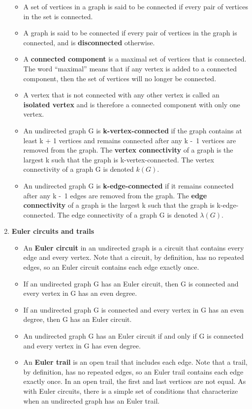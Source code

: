 \documentclass[12pt,a4paper]{article}
\begin{document}
\begin{enumerate}
  \begin{itemize}
    \item A set of vertices in a graph is said to be connected if every pair of vertices in the set is connected.
    \item A graph is said to be connected if every pair of vertices in the graph is connected, and is \textbf{disconnected} otherwise.
    \item A \textbf{connected component} is a maximal set of vertices that is connected. The word ``maximal'' means that if any vertex is added to a connected component, then the set of vertices will no longer be connected.
    \item A vertex that is not connected with any other vertex is called an \textbf{isolated vertex} and is therefore a connected component with only one vertex.
    \item An undirected graph G is \textbf{k-vertex-connected} if the graph contains at least k + 1 vertices and remains connected after any k -\ 1 vertices are removed from the graph. The \textbf{vertex connectivity} of a graph is the largest k such that the graph is k-vertex-connected. The vertex connectivity of a graph G is denoted \(k(G)\).
    \item An undirected graph G is \textbf{k-edge-connected} if it remains connected after any k -\ 1 edges are removed from the graph. The \textbf{edge connectivity} of a graph is the largest k such that the graph is k-edge-connected. The edge connectivity of a graph G is denoted \(\lambda (G)\).
  \end{itemize}
  \item \textbf{Euler circuits and trails}
  \begin{itemize}
    \item An \textbf{Euler circuit} in an undirected graph is a circuit that contains every edge and every vertex. Note that a circuit, by definition, has no repeated edges, so an Euler circuit contains each edge exactly once.
    \item If an undirected graph G has an Euler circuit, then G is connected and every vertex in G has an even degree.
    \item If an undirected graph G is connected and every vertex in G has an even degree, then G has an Euler circuit.
    \item An undirected graph G has an Euler circuit if and only if G is connected and every vertex in G has even degree.
    \item An \textbf{Euler trail} is an open trail that includes each edge. Note that a trail, by definition, has no repeated edges, so an Euler trail contains each edge exactly once. In an open trail, the first and last vertices are not equal. As with Euler circuits, there is a simple set of conditions that characterize when an undirected graph has an Euler trail.

\end{itemize}
\end{enumerate}
\end{document}
